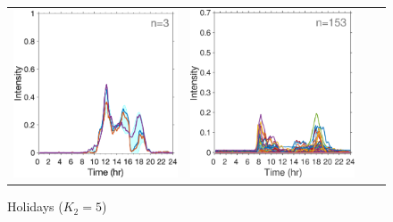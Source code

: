 \documentclass{article}
\begin{document}
\begin{figure}[h!]
\begin{center}
\begin{tabular}{cccc}
			\includegraphics[scale=0.1]{../2Fittedy/plot/holiday_5/fitted_y_cluster5_5.eps} 
			&\hspace*{-0.6cm}
			\includegraphics[scale=0.1]{../2Fittedy/plot/weekday_7/remove_data.eps} 
			&\hspace*{-0.6cm}

			&\hspace*{-0.6cm}

		\end{tabular}
		
		
		\caption{Holidays ($K_2=5$)}
	\end{center}
	
\end{figure}
\end{document}
